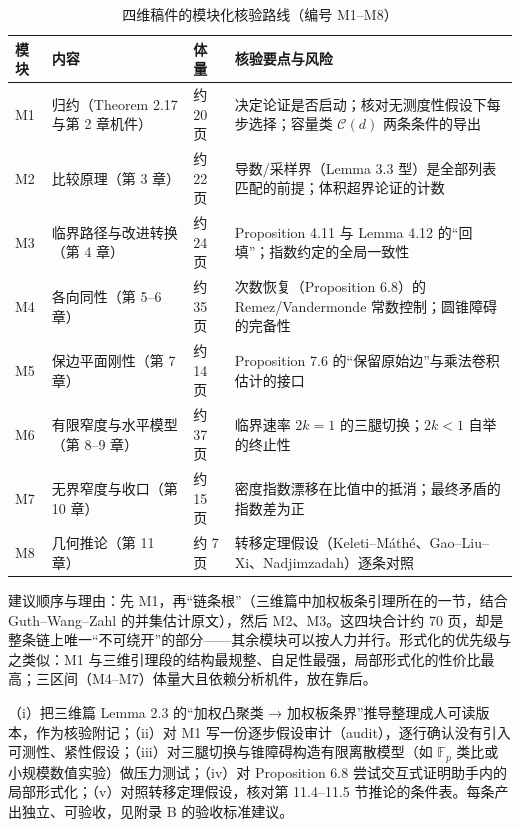 \begin{table}[t]
\centering
\caption{四维稿件的模块化核验路线（编号 M1--M8）}
\label{tab:modules}
\footnotesize
\begin{tabularx}{\textwidth}{@{}L{0.9cm}L{3.4cm}L{1.2cm}Y@{}}
\toprule
{}\textbf{模块} & \textbf{内容} & \textbf{体量} & \textbf{核验要点与风险} \\
\midrule
M1 & 归约（Theorem 2.17 与第 2 章机件） & 约 20 页 & 决定论证是否启动；核对无测度性假设下每步选择；容量类 $\mathcal{C}(d)$ 两条条件的导出 \\
M2 & 比较原理（第 3 章） & 约 22 页 & 导数/采样界（Lemma 3.3 型）是全部列表匹配的前提；体积超界论证的计数 \\
M3 & 临界路径与改进转换（第 4 章） & 约 24 页 & Proposition 4.11 与 Lemma 4.12 的“回填”；指数约定的全局一致性 \\
M4 & 各向同性（第 5--6 章） & 约 35 页 & 次数恢复（Proposition 6.8）的 Remez/Vandermonde 常数控制；圆锥障碍的完备性 \\
M5 & 保边平面刚性（第 7 章） & 约 14 页 & Proposition 7.6 的“保留原始边”与乘法卷积估计的接口 \\
M6 & 有限窄度与水平模型（第 8--9 章） & 约 37 页 & 临界速率 $2k=1$ 的三腿切换；$2k<1$ 自举的终止性 \\
M7 & 无界窄度与收口（第 10 章） & 约 15 页 & 密度指数漂移在比值中的抵消；最终矛盾的指数差为正 \\
M8 & 几何推论（第 11 章） & 约 7 页 & 转移定理假设（Keleti--M\'ath\'e、Gao--Liu--Xi、Nadjimzadah）逐条对照 \\
\bottomrule
\end{tabularx}
\end{table}

建议顺序与理由：先 M1，再“链条根”（三维篇中加权板条引理所在的一节，结合 Guth--Wang--Zahl 的并集估计原文），然后 M2、M3。这四块合计约 70 页，却是整条链上唯一“不可绕开”的部分——其余模块可以按人力并行。形式化的优先级与之类似：M1 与三维引理段的结构最规整、自足性最强，局部形式化的性价比最高；三区间（M4--M7）体量大且依赖分析机件，放在靠后。

\begin{dirbox}
（i）把三维篇 Lemma 2.3 的“加权凸聚类 → 加权板条界”推导整理成人可读版本，作为核验附记；（ii）对 M1 写一份逐步假设审计（audit），逐行确认没有引入可测性、紧性假设；（iii）对三腿切换与锥障碍构造有限离散模型（如 $\mathbb{F}_p$ 类比或小规模数值实验）做压力测试；（iv）对 Proposition 6.8 尝试交互式证明助手内的局部形式化；（v）对照转移定理假设，核对第 11.4--11.5 节推论的条件表。每条产出独立、可验收，见附录 B 的验收标准建议。
\end{dirbox}

